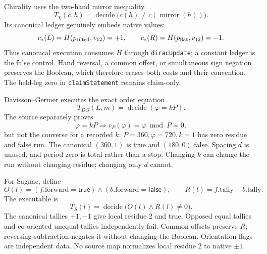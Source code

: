 Chirality uses the two-hand mirror inequality
\[
 T_\chi(c,h)=\operatorname{decide}\bigl(c(h)\ne c(\operatorname{mirror}(h))\bigr).
\]
Its canonical ledger genuinely embeds native values:
\[
 c_\ast(L)=H(p_{\rm tilted},v_{12})=+1,\qquad
 c_\ast(R)=H(p_{\rm flat},v_{12})=-1.
\]
Thus canonical execution consumes \(H\) through \texttt{diracUpdate}; a constant ledger is the false control.  Hand
reversal, a common offset, or simultaneous sign negation preserves the Boolean, which therefore erases both costs and
their convention.  The held-leg zero in \texttt{claimStatement} remains claim-only.

Davisson--Germer executes the exact order equation
\[
 T_{DG}(L,m)=\operatorname{decide}(\varphi=kP).
\]
The source separately proves
\[
 \varphi=kP\Longrightarrow r_P(\varphi)=\varphi\bmod P=0,
\]
but not the converse for a recorded \(k\): \(P=360,\varphi=720,k=1\) has zero residue and false run.  The canonical
\((360,1)\) is true and \((180,0)\) false.  Spacing \(d\) is unused, and period zero is total rather than a stop.
Changing \(k\) can change the run without changing residue; changing only \(d\) cannot.

For Sagnac, define
\[
 O(l)=(f.\mathrm{forward}=\mathsf{true})\land
      (b.\mathrm{forward}=\mathsf{false}),\qquad
 R(l)=f.\mathrm{tally}-b.\mathrm{tally}.
\]
The executable is
\[
 T_S(l)=\operatorname{decide}\bigl(O(l)\land R(l)\ne0\bigr).
\]
The canonical tallies \(+1,-1\) give local residue \(2\) and true.  Opposed equal tallies and co-oriented unequal
tallies independently fail.  Common offsets preserve \(R\); reversing subtraction negates it without changing the
Boolean.  Orientation flags are independent data.  No source map normalizes local residue \(2\) to native \(\pm1\).


